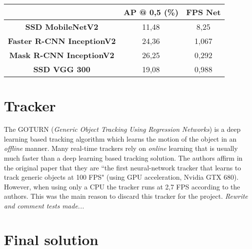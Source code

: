 \begin{table}[H]
\tiny
\begin{center}
\begin{tabular}{|c|c|c|}
\hline
\textbf{}                         & \textbf{AP @ 0,5 (\%)} & \textbf{FPS Net} \\ \hline
\textbf{SSD MobileNetV2}          & 11,48                  & 8,25             \\ \hline
\textbf{Faster R-CNN InceptionV2} & 24,36                  & 1,067            \\ \hline
\textbf{Mask R-CNN InceptionV2}   & 26,25                  & 0,292            \\ \hline
\textbf{SSD VGG 300}              & 19,08                  & 0,988            \\ \hline
\end{tabular}
\end{center}
\caption{}
\label{tab:net_exp_2}
\end{table}
\section{Tracker}
The GOTURN (\textit{Generic Object Tracking Using Regression Networks}) is a deep learning based tracking algorithm which learns the motion of the object in an \textit{offline} manner. Many real-time trackers rely on \textit{online} learning that is usually much faster than a deep learning based tracking solution. The authors affirm in the original paper \cite{held2016learning} that they are ``the first neural-network tracker that learns to track generic objects at 100 FPS" (using GPU acceleration, Nvidia GTX 680). However, when using only a CPU the tracker runs at 2,7 FPS according to the authors. This was the main reason to discard this tracker for the project. \textit{Rewrite and comment tests made...}%
\section{Final solution}
